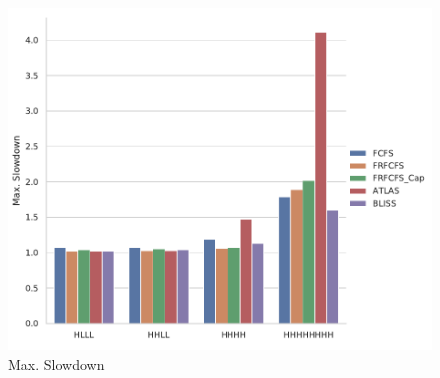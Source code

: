 \documentclass[a4paper]{article}
\begin{document}
\begin{figure}
    \centering
    \includegraphics[width=\textwidth]{max_slowdown}
    \caption{Max. Slowdown}
    \label{fig:max-slowdown}
\end{figure}
\end{document}
